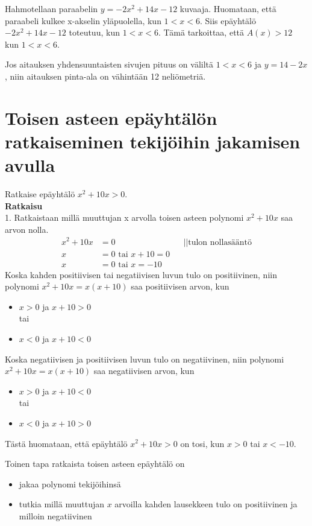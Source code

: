 \begin{esimerkki}
Hahmotellaan paraabelin $y=-2x^2+14x-12$ kuvaaja. Huomataan, että paraabeli kulkee x-akselin yläpuolella, kun $1<x<6$. 
Siis epäyhtälö $-2x^2+14x-12$ toteutuu, kun $1<x<6$. Tämä tarkoittaa, että $A(x)>12$ kun $1<x<6$.

Jos aitauksen yhdensuuntaisten sivujen pituus on väliltä $1<x<6$ ja $y=14-2x$, niin aitauksen pinta-ala on vähintään 12 neliömetriä.
\end{esimerkki}
\section{Toisen asteen epäyhtälön ratkaiseminen tekijöihin jakamisen avulla}
\begin{esimerkki} 
Ratkaise epäyhtälö $x^2+10x>0$. \\
\textbf{Ratkaisu} \\
1. Ratkaistaan millä muuttujan x arvolla toisen asteen polynomi $x^2+10x$ saa arvon nolla. 
\begin{align*}
x^2+10x&=0 \ \ \ \ &&||\text{tulon nollasääntö} \\
x&=0 \text{ tai } x+10=0 \\
x&=0 \text{ tai } x=-10
\end{align*}
Koska kahden positiivisen tai negatiivisen luvun tulo on positiivinen, niin
polynomi $x^2+10x=x(x+10)$ saa positiivisen arvon, kun 
\begin{itemize}
\item{$x>0$ ja $x+10>0$} \\tai \\
\item{$x<0$ ja $x+10<0$} 
\end{itemize}
Koska negatiivisen ja positiivisen luvun tulo on negatiivinen, niin
polynomi $x^2+10x=x(x+10)$ saa negatiivisen arvon, kun
\begin{itemize}
\item{$x>0$ ja $x+10<0$} \\ tai \\
\item{$x<0$ ja $x+10>0$} \\
\end{itemize}
Tästä huomataan, että epäyhtälö $x^2+10x>0$ on tosi, kun $x>0$ tai $x<-10$. 
\end{esimerkki} 

Toinen tapa ratkaista toisen asteen epäyhtälö on 
\begin{itemize}
\item{jakaa polynomi tekijöihinsä }
\item{tutkia millä muuttujan $x$ arvoilla kahden lausekkeen tulo on positiivinen ja milloin negatiivinen}
\end{itemize}

